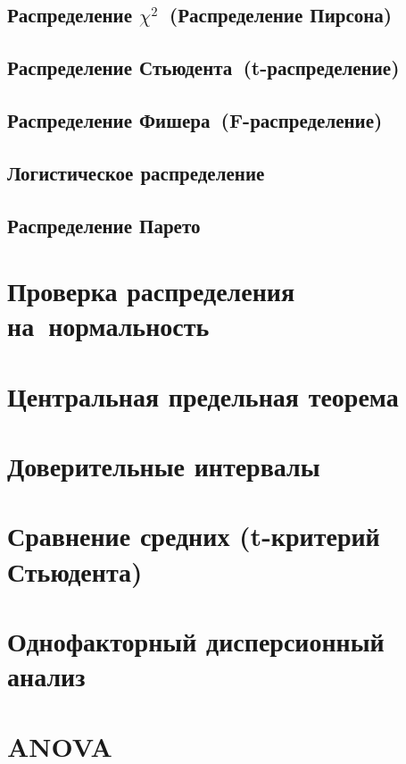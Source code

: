 \documentclass[]{scrartcl}
\begin{document}
\subsection{Распределение $\chi^{2}$~(Распределение Пирсона)}

\subsection{Распределение Стьюдента~(t-распределение)}

\subsection{Распределение Фишера~(F-распределение)}
 
\subsection{Логистическое распределение}

\subsection{Распределение Парето}

\section{Проверка распределения на~нормальность}

\section{Центральная предельная теорема}

\section{Доверительные интервалы}

\section{Сравнение средних (t-критерий Стьюдента)}

\section{Однофакторный дисперсионный анализ}

\section{ANOVA}
\end{document}
